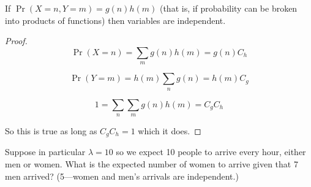 \begin{proposition} \label{stoch.ross.inclass1}If \(\Pr(X=n, Y=m) = g(n) h(m)\) (that is, if probability can be broken into products of functions) then variables are independent.

\end{proposition}

\begin{proof} 

\[
\Pr(X=n) = \sum_m g(n) h(m) = g(n) C_h
\]

\[
\Pr(Y=m) = h(m) \sum_n g(n) = h(m) C_g
\]

\[
1 = \sum_n \sum_m g(n) h(m) = C_g C_h
\]

So this is true as long as \(C_g C_h =1\) which it does.

\end{proof}

\begin{example}

Suppose in particular \(\lambda =10\) so we expect 10 people to arrive every hour, either men or women. What is the expected number of women to arrive given that 7 men arrived? (5---women and men's arrivals are independent.)

\end{example}

